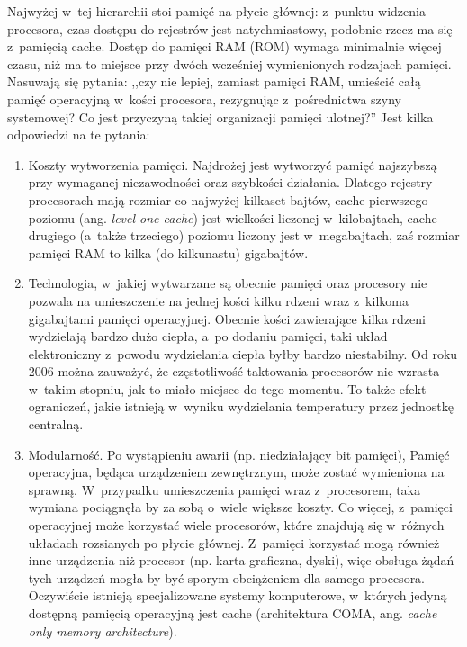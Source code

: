 \documentclass[12pt,makeidx]{mwart}
\begin{document}
	Najwyżej w~tej hierarchii stoi pamięć na płycie głównej: z~punktu widzenia procesora, czas dostępu do rejestrów jest natychmiastowy,
	podobnie rzecz ma się z~pamięcią cache. Dostęp do pamięci RAM (ROM) wymaga minimalnie więcej czasu, niż ma to miejsce przy dwóch
	wcześniej wymienionych rodzajach pamięci. Nasuwają się pytania: ,,czy nie lepiej, zamiast pamięci RAM, umieścić całą
	pamięć operacyjną w~kości procesora, rezygnując z~pośrednictwa szyny systemowej\mbox{}? Co jest przyczyną takiej organizacji pamięci ulotnej\mbox{}?''
	Jest kilka odpowiedzi na te pytania:
	\begin{enumerate}
		\item Koszty wytworzenia pamięci. Najdrożej jest wytworzyć pamięć najszybszą przy wymaganej niezawodności oraz szybkości działania.
			Dlatego rejestry procesorach mają rozmiar co najwyżej kilkaset bajtów, cache pierwszego poziomu (ang. \emph{level one cache})
			jest wielkości liczonej w~kilobajtach, cache drugiego (a~także trzeciego) poziomu liczony jest w~megabajtach, zaś
			rozmiar pamięci RAM to kilka (do kilkunastu) gigabajtów.
		\item Technologia, w~jakiej wytwarzane są obecnie pamięci oraz procesory nie pozwala na umieszczenie na jednej kości kilku rdzeni
			wraz z~kilkoma gigabajtami pamięci operacyjnej. Obecnie kości zawierające kilka rdzeni wydzielają bardzo dużo ciepła, a~po dodaniu
			pamięci, taki układ elektroniczny z~powodu wydzielania ciepła byłby bardzo niestabilny. Od roku 2006 można zauważyć,
			że częstotliwość taktowania procesorów nie wzrasta w~takim stopniu, jak to miało miejsce do tego momentu. To także efekt ograniczeń,
			jakie istnieją w~wyniku wydzielania temperatury przez jednostkę centralną.
		\item Modularność. Po wystąpieniu awarii (np. niedziałający bit pamięci), Pamięć operacyjna, będąca urządzeniem zewnętrznym, może zostać
			wymieniona na sprawną. W~przypadku umieszczenia pamięci wraz z~procesorem, taka wymiana pociągnęła by za sobą o~wiele większe
			koszty. Co więcej, z~pamięci operacyjnej może korzystać wiele procesorów, które znajdują się w~różnych układach rozsianych po płycie głównej.
			Z~pamięci korzystać mogą również inne urządzenia niż procesor (np. karta graficzna, dyski), więc obsługa żądań tych urządzeń mogła by być
			sporym obciążeniem dla samego procesora. Oczywiście istnieją specjalizowane systemy komputerowe, w~których jedyną dostępną 
			pamięcią operacyjną jest cache (architektura COMA, ang. \emph{cache only memory architecture}).
	\end{enumerate}
\end{document}
